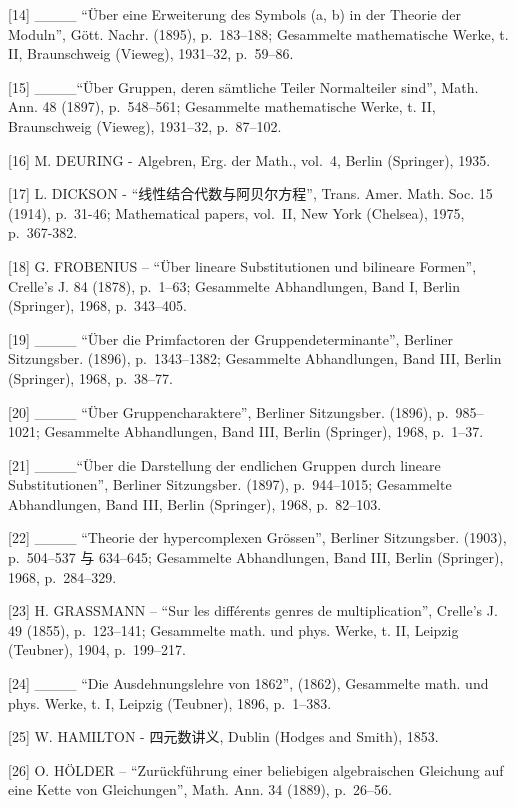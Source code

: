 {[}14{]} \_\_\_\_ ``Über eine Erweiterung des Symbols (a, b) in der Theorie der Moduln'', Gött. Nachr. (1895), p.~183--188; Gesammelte mathematische Werke, t. II, Braunschweig (Vieweg), 1931--32, p.~59--86.

{[}15{]} \_\_\_\_``Über Gruppen, deren sämtliche Teiler Normalteiler sind'', Math. Ann. 48 (1897), p.~548--561; Gesammelte mathematische Werke, t. II, Braunschweig (Vieweg), 1931--32, p.~87--102.

{[}16{]} M. DEURING - Algebren, Erg. der Math., vol.~4, Berlin (Springer), 1935.

{[}17{]} L. DICKSON - ``线性结合代数与阿贝尔方程'', Trans. Amer. Math. Soc. 15 (1914), p.~31-46; Mathematical papers, vol.~II, New York (Chelsea), 1975, p.~367-382.

{[}18{]} G. FROBENIUS -- ``Über lineare Substitutionen und bilineare Formen'', Crelle's J. 84 (1878), p.~1--63; Gesammelte Abhandlungen, Band I, Berlin (Springer), 1968, p.~343--405.

{[}19{]} \_\_\_\_ ``Über die Primfactoren der Gruppendeterminante'', Berliner Sitzungsber. (1896), p.~1343--1382; Gesammelte Abhandlungen, Band III, Berlin (Springer), 1968, p.~38--77.

{[}20{]} \_\_\_\_ ``Über Gruppencharaktere'', Berliner Sitzungsber. (1896), p.~985--1021; Gesammelte Abhandlungen, Band III, Berlin (Springer), 1968, p.~1--37.

{[}21{]} \_\_\_\_``Über die Darstellung der endlichen Gruppen durch lineare Substitutionen'', Berliner Sitzungsber. (1897), p.~944--1015; Gesammelte Abhandlungen, Band III, Berlin (Springer), 1968, p.~82--103.

{[}22{]} \_\_\_\_ ``Theorie der hypercomplexen Grössen'', Berliner Sitzungsber. (1903), p.~504--537 与 634--645; Gesammelte Abhandlungen, Band III, Berlin (Springer), 1968, p.~284--329.

{[}23{]} H. GRASSMANN -- ``Sur les différents genres de multiplication'', Crelle's J. 49 (1855), p.~123--141; Gesammelte math. und phys. Werke, t. II, Leipzig (Teubner), 1904, p.~199--217.

{[}24{]} \_\_\_\_ ``Die Ausdehnungslehre von 1862'', (1862), Gesammelte math. und phys. Werke, t. I, Leipzig (Teubner), 1896, p.~1--383.

{[}25{]} W. HAMILTON - 四元数讲义, Dublin (Hodges and Smith), 1853.

{[}26{]} O. HÖLDER -- ``Zurückführung einer beliebigen algebraischen Gleichung auf eine Kette von Gleichungen'', Math. Ann. 34 (1889), p.~26--56.

